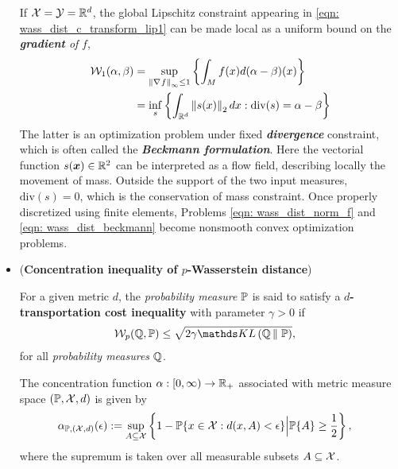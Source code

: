 \documentclass[11pt]{article}
\begin{document}
\begin{itemize}
If ${\mathcal X} = {\mathcal Y} = {\mathbb R}^{d}$,  the global Lipschitz constraint appearing in \eqref{eqn: wass_dist_c_transform_lip1} can be made local as a uniform bound on the \emph{\textbf{gradient} of} $f$,
\begin{align}
{\mathcal W}_{1}(\alpha, \beta) &= \sup_{\left\|\nabla_{}{f}\right\|_{\infty} \le 1}\left\{\int_{M} f(x) d(\alpha - \beta)(x) \right\}  \label{eqn: wass_dist_norm_f} \\
&= \inf_{s}\left\{\int_{{\mathbb R}^{d}} \left\|s(x)\right\|_{2}dx:  \text{div}(s) = \alpha - \beta \right\}  \label{eqn: wass_dist_beckmann}
\end{align} The latter is  an optimization problem under fixed \emph{\textbf{divergence}} constraint, which is often called the \textbf{\emph{Beckmann formulation}}. Here the vectorial function $s(\boldsymbol{x}) \in {\mathbb R}^2$ can be interpreted as a flow field, describing locally the movement of mass. Outside the support of the two input measures,  $\text{div}(s) = 0$, which is the conservation of mass constraint. Once properly discretized using finite elements, Problems \eqref{eqn: wass_dist_norm_f} and \eqref{eqn: wass_dist_beckmann} become nonsmooth convex optimization problems. 

\item (\textbf{Concentration inequality of $p$-Wasserstein distance}) 
\begin{definition}\citep{wainwright2019high} For a given metric $d$, the \emph{probability measure} ${\mathbb P}$ is said to satisfy a \textbf{$d$-transportation cost inequality} with parameter $\gamma > 0$ if
\begin{align}
\cW_{p}(\bQ, \bP) &\le \sqrt{2 \gamma \kl{\bQ}{\bP}},  \label{eqn: wasserstein_inequality}
\end{align}  for all \emph{probability measures} ${\mathbb Q}$.
\end{definition}

\begin{definition}\citep{wainwright2019high} The concentration function $\alpha: [0, \infty) \rightarrow  {\mathbb R}_{+}$ associated with metric
measure space $({\mathbb P}, {\mathcal X}, d)$ is given by
\begin{align}
\alpha_{{\mathbb P},({\mathcal X},d)}(\epsilon) &:= \sup_{A \subseteq {\mathcal X} }\left\{1- {\mathbb P}\{x\in {\mathcal X}: d(x, A) < \epsilon\} \Big| {\mathbb P}\{A\} \ge \frac{1}{2}\right\},  \label{eqn: concentration_function}
\end{align} where the supremum is taken over all measurable subsets $A \subseteq {\mathcal X}$.
\end{definition}


\end{itemize}
\end{document}
